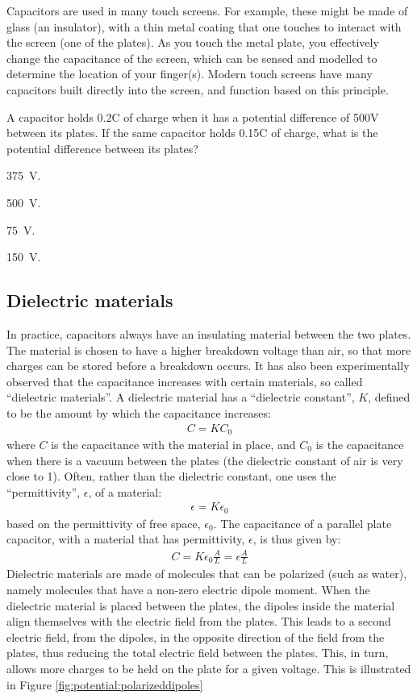 Capacitors are used in many touch screens. For example, these might be made of glass (an insulator), with a thin metal coating that one touches to interact with the screen (one of the plates). As you touch the metal plate, you effectively change the capacitance of the screen, which can be sensed and modelled to determine the location of your finger(s). Modern touch screens have many capacitors built directly into the screen, and function based on this principle. 

\begin{checkpoint}
	\begin{MCquestion}{A capacitor holds 0.2C of charge when it has a potential difference of 500V between its plates. If the same capacitor holds 0.15C of charge, what is the potential difference between its plates?}
		\item \SI{375}{V}. \correct
		\item \SI{500}{V}.
		\item \SI{75}{V}.
		\item \SI{150}{V}.
	\end{MCquestion}
\end{checkpoint}

\subsection{Dielectric materials}
In practice, capacitors always have an insulating material between the two plates. The material is chosen to have a higher breakdown voltage than air, so that more charges can be stored before a breakdown occurs. It has also been experimentally observed that the capacitance increases with certain materials, so called ``dielectric materials''. A dielectric material has a ``dielectric constant'', $K$, defined to be the amount by which the capacitance increases:
\begin{align*}
C=KC_0
\end{align*}
where $C$ is the capacitance with the material in place, and $C_0$ is the capacitance when there is a vacuum between the plates (the dielectric constant of air is very close to 1). Often, rather than the dielectric constant, one uses the ``permittivity'', $\epsilon$, of a material:
\begin{align*}
\epsilon=K\epsilon_0
\end{align*}
based on the permittivity of free space, $\epsilon_0$. The capacitance of a parallel plate capacitor, with a material that has permittivity, $\epsilon$, is thus given by:
\begin{align*}
C=K\epsilon_0\frac{A}{L}=\epsilon\frac{A}{L}
\end{align*}
Dielectric materials are made of molecules that can be polarized (such as water), namely molecules that have a non-zero electric dipole moment. When the dielectric material is placed between the plates, the dipoles inside the material align themselves with the electric field from the plates. This leads to a second electric field, from the dipoles, in the opposite direction of the field from the plates, thus reducing the total electric field between the plates. This, in turn, allows more charges to be held on the plate for a given voltage. This is illustrated in Figure \ref{fig:potential:polarizeddipoles}

